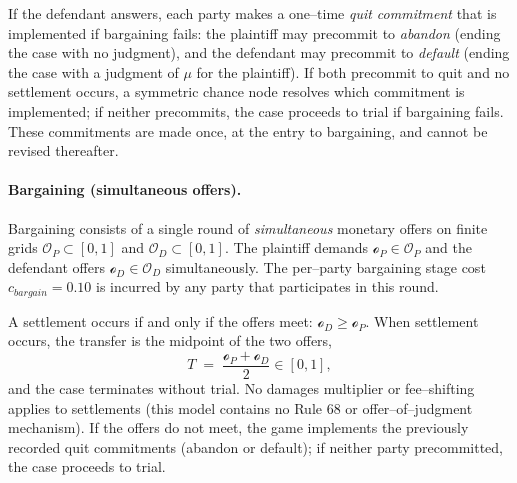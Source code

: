 \documentclass{article}
\begin{document}
If the defendant answers, each party makes a one–time \emph{quit commitment} that is implemented if bargaining fails: the plaintiff may precommit to \emph{abandon} (ending the case with no judgment), and the defendant may precommit to \emph{default} (ending the case with a judgment of $\mu$ for the plaintiff). If both precommit to quit and no settlement occurs, a symmetric chance node resolves which commitment is implemented; if neither precommits, the case proceeds to trial if bargaining fails. These commitments are made once, at the entry to bargaining, and cannot be revised thereafter.

\paragraph{Bargaining (simultaneous offers).}
Bargaining consists of a single round of \emph{simultaneous} monetary offers on finite grids $\mathcal{O}_P\subset[0,1]$ and $\mathcal{O}_D\subset[0,1]$. The plaintiff demands $\mathcal{o}_P\in\mathcal{O}_P$ and the defendant offers $\mathcal{o}_D\in\mathcal{O}_D$ simultaneously. The per–party bargaining stage cost $c_{bargain}=0.10$ is incurred by any party that participates in this round.

A settlement occurs if and only if the offers meet: $\mathcal{o}_D\ge \mathcal{o}_P$. When settlement occurs, the transfer is the midpoint of the two offers,
\[
T \;=\; \frac{\mathcal{o}_P+\mathcal{o}_D}{2}\in[0,1],
\]
and the case terminates without trial. No damages multiplier or fee–shifting applies to settlements (this model contains no Rule 68 or offer–of–judgment mechanism). If the offers do not meet, the game implements the previously recorded quit commitments (abandon or default); if neither party precommitted, the case proceeds to trial.
\end{document}
